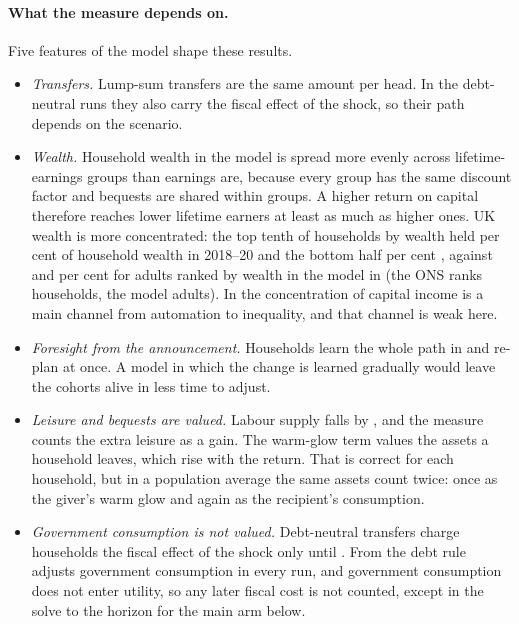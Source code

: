 \paragraph{What the measure depends on.} Five features of the model shape these results.
\begin{itemize}
\item \emph{Transfers.} Lump-sum transfers are the same amount per head. In the debt-neutral runs they also carry the fiscal effect of the shock, so their path depends on the scenario.
\item \emph{Wealth.} Household wealth in the model is spread more evenly across lifetime-earnings groups than earnings are, because every group has the same discount factor and bequests are shared within groups. A higher return on capital therefore reaches lower lifetime earners at least as much as higher ones. UK wealth is more concentrated: the top tenth of households by wealth held \genCohOnsWealthTopTenth{} per cent of household wealth in 2018--20 and the bottom half \genCohOnsWealthBottomHalf{} per cent \citep{ons2022wealth}, against \genCohWealthTopTenthCentral{} and \genCohWealthBottomHalfCentral{} per cent for adults ranked by wealth in the model in \genShockYear{} (the ONS ranks households, the model adults). In \citet{moll2022} the concentration of capital income is a main channel from automation to inequality, and that channel is weak here.
\item \emph{Foresight from the announcement.} Households learn the whole path in \genShockYear{} and re-plan at once. A model in which the change is learned gradually would leave the cohorts alive in \genShockYear{} less time to adjust.
\item \emph{Leisure and bequests are valued.} Labour supply falls by \genHeadYear{}, and the measure counts the extra leisure as a gain. The warm-glow term values the assets a household leaves, which rise with the return. That is correct for each household, but in a population average the same assets count twice: once as the giver's warm glow and again as the recipient's consumption.
\item \emph{Government consumption is not valued.} Debt-neutral transfers charge households the fiscal effect of the shock only until \genLastFlowYear{}. From \genDebtRuleYear{} the debt rule adjusts government consumption in every run, and government consumption does not enter utility, so any later fiscal cost is not counted, except in the solve to the horizon for the main arm below.
\end{itemize}


